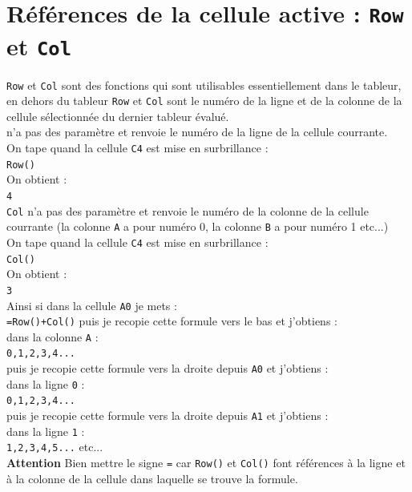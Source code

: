 \documentclass[a4paper,11pt]{book}
\begin{document}
\section{R\'ef\'erences de la cellule active : {\tt Row} et {\tt Col}}
{\tt Row} et {\tt Col} sont des fonctions qui sont utilisables essentiellement
dans le tableur, en dehors du tableur {\tt Row} et {\tt Col} sont le num\'ero 
de la ligne et de la colonne de la cellule s\'electionn\'ee du dernier tableur
\'evalu\'e.\\
 n'a pas des param\`etre et renvoie le num\'ero de la ligne 
de la cellule courrante.\\
On tape quand la cellule {\tt C4} est mise en surbrillance :\\
{\tt Row()}\\
On obtient :\\
{\tt 4}\\
{\tt Col} n'a pas des param\`etre et renvoie le num\'ero de la colonne 
de la cellule courrante (la colonne {\tt A} a pour num\'ero 0, 
la colonne {\tt B} a pour num\'ero 1 etc...)\\
On tape quand la cellule {\tt C4} est mise en surbrillance :\\
{\tt Col()}\\
On obtient :\\
{\tt 3}\\
Ainsi si dans la cellule {\tt A0} je mets :\\
{\tt =Row()+Col()}
puis je recopie cette formule vers le bas et j'obtiens :\\
dans la colonne {\tt A} :\\
 {\tt 0,1,2,3,4...}\\
puis je recopie cette formule vers la droite depuis {\tt A0} et j'obtiens :\\
dans la ligne {\tt 0} :\\
 {\tt 0,1,2,3,4...}\\
puis je recopie cette formule vers la droite depuis {\tt A1} et j'obtiens :\\
dans la ligne {\tt 1} : \\
{\tt 1,2,3,4,5...} etc...\\
{\bf Attention} Bien mettre le signe {\tt =} car {\tt Row()} et {\tt Col()}
font r\'ef\'erences \`a la ligne et \`a la colonne de la cellule dans laquelle 
se trouve la formule.
\end{document}
